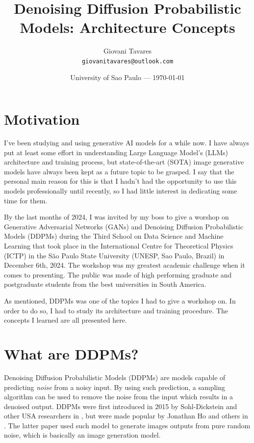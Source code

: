 \documentclass{article}
\title{Denoising Diffusion Probabilistic Models: Architecture Concepts} %
\author{Giovani Tavares\\ \texttt{giovanitavares@outlook.com}} %
\date{University of Sao Paulo --- \today} %
\begin{document}
\maketitle %


\section*{Motivation} %

I've been studying and using generative AI models for a while now. I have always put at least some effort in understanding Large Language Model's (LLMs) architecture and training process, but state-of-the-art (SOTA) image generative models have always been kept as a future topic to be grasped. I say that the personal main reason for this is that I hadn't had the opportunity to use this models professionally until recently, so I had little interest in dedicating some time for them.

By the last months of 2024, I was invited by my boss to give a worshop on Generative Adversarial Networks (GANs) and Denoising Diffusion Probabilistic Models (DDPMs) during the Third School on Data Science and Machine Learning that took place in the International Centre for Theoretical Physics (ICTP) in the São Paulo State University (UNESP, Sao Paulo, Brazil) in December 6th, 2024. The workshop was my greatest academic challenge when it comes to presenting. The public was made of high performing graduate and postgraduate students from the best universities in South America. 

As mentioned, DDPMs was one of the topics I had to give a workshop on. In order to do so, I had to study its architecture and training procedure. The concepts I learned are all presented here.


\section{What are DDPMs?} %

Denoising Diffusion Probabilistic Models (DDPMs) are  models capable of predicting \textit{noise} from a noisy input. By using such prediction, a sampling algorithm can be used to remove the noise from the input which results in a denoised output. DDPMs were first introduced in 2015 by Sohl-Dickstein and other USA researchers in \cite{DBLP:journals/corr/Sohl-DicksteinW15}, but were made popular by Jonathan Ho and others in \cite{DBLP:journals/corr/abs-2006-11239}. The latter paper used such model to generate images outputs from pure random noise, which is basically an image generation model.
\end{document}
